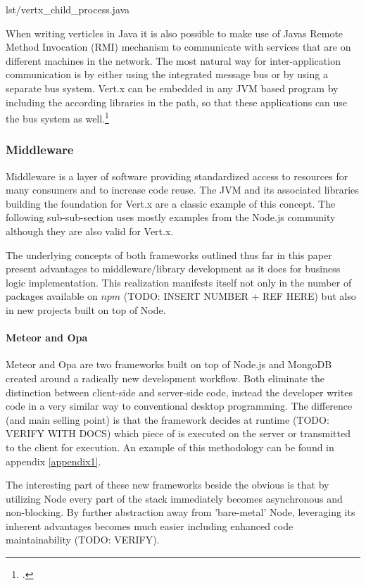 %
{lst/vertx_child_process.java}

When writing verticles in Java it is also possible to make use of Javas Remote
Method Invocation (RMI) mechanism to communicate with services that are on different
machines in the network.
The most natural way for inter-application communication is by either using the
integrated message bus or by using a separate bus system.
Vert.x can be embedded in any JVM based program by including the according
libraries in the path, so that these applications can use the bus system as
well.\footcite[Cf.][]{vertx_2012}

\subsubsection{Middleware}
\label{middleware}
Middleware is a layer of software providing standardized access to resources for many consumers and to increase code reuse. The JVM and its associated libraries building the foundation for Vert.x are a classic example of this concept. The following sub-sub-section uses mostly examples from the Node.js community although they are also valid for Vert.x.

The underlying concepts of both frameworks outlined thus far in this paper present advantages to middleware/library development as it does for business logic implementation. This realization manifests itself not only in the number of packages available on $npm$ (TODO: INSERT NUMBER + REF HERE) but also in new projects built on top of Node.

\paragraph{Meteor and Opa}
Meteor and Opa are two frameworks built on top of Node.js and MongoDB created around a radically new development workflow. Both eliminate the distinction between client-side and server-side code, instead the developer writes code in a very similar way to conventional desktop programming. The difference (and main selling point) is that the framework decides at runtime (TODO: VERIFY WITH DOCS) which piece of is executed on the server or transmitted to the client for execution. An example of this methodology can be found in appendix \ref{appendix1}.

The interesting part of these new frameworks beside the obvious is that by utilizing Node every part of the stack immediately becomes asynchronous and non-blocking. By further abstraction away from 'bare-metal' Node, leveraging its inherent advantages becomes much easier including enhanced code maintainability (TODO: VERIFY).

